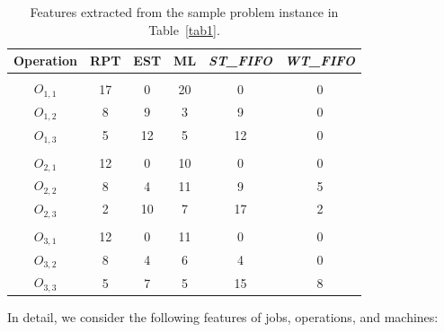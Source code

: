 \documentclass[runningheads]{llncs}
\newcommand{\stfifo}{\textit{ST\_FIFO}\xspace}
\newcommand{\wtfifo}{\textit{WT\_FIFO}\xspace}
\begin{document}
\begin{table}[tb]
  \setlength{\tabcolsep}{10.0pt}
  \centering
    \begin{center}
    \caption{Features extracted from the sample problem instance in Table~\ref{tab1}.}
    \label{tab3}
      \begin{tabular}{c  c  c  c  c  c}
        \textbf{Operation} & \textbf{RPT} & \textbf{EST} & \textbf{ML} & \textbf{\stfifo} & \textbf{\wtfifo}\\
        \hline
                      \\
        $O_{1,1}$  & 17 & 0   & 20	&  0  & 0\\
        $O_{1,2}$  & 8  & 9   & 3		&  9  & 0\\
        $O_{1,3}$  & 5  & 12  & 5	  &  12 & 0\\
                      \\
        $O_{2,1}$  & 12 & 0   & 10	&  0  & 0\\
        $O_{2,2}$  & 8  & 4   & 11	&  9  & 5\\
        $O_{2,3}$  & 2  & 10  & 7	  &  17 & 2\\
                          \\
        $O_{3,1}$  & 12 & 0  & 11	  &  0  & 0\\
        $O_{3,2}$  & 8  & 4  & 6		&  4  & 0\\
        $O_{3,3}$  & 5  & 7  & 5		&  15 & 8\\
      \end{tabular}
    \end{center} 
  \end{table}
%
In detail, we consider the following features of jobs, operations, and machines:
\end{document}
